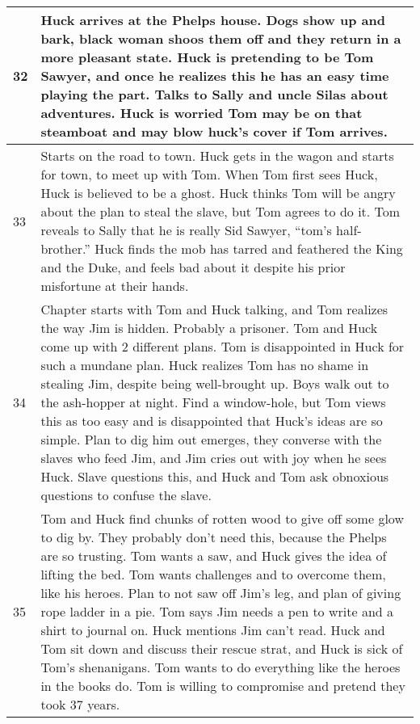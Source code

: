 \documentclass[10pt]{article}
\begin{document}
\section*{}
\begin{tabular}{|||l||p{15cm}|||}
\hline \hline
	32 & Huck arrives at the Phelps house.  Dogs show up and bark, black woman shoos them off and they return in a more pleasant state.  Huck is pretending to be Tom Sawyer, and once he realizes this he has an easy time playing the part.  Talks to Sally and uncle Silas about adventures.  Huck is worried Tom may be on that steamboat and may blow huck's cover if Tom arrives.\\ \hline \hline
	33 & Starts on the road to town.  Huck gets in the wagon and starts for town, to meet up with Tom.  When Tom first sees Huck, Huck is believed to be a ghost.  Huck thinks Tom will be angry about the plan to steal the slave, but Tom agrees to do it.  Tom reveals to Sally that he is really Sid Sawyer, ``tom's half-brother.''  Huck finds the mob has tarred and feathered the King and the Duke, and feels bad about it despite his prior misfortune at their hands.\\ \hline \hline
	34 & Chapter starts with Tom and Huck talking, and Tom realizes the way Jim is hidden.  Probably a prisoner.  Tom and Huck come up with 2 different plans.  Tom is disappointed in Huck for such a mundane plan.  Huck realizes Tom has no shame in stealing Jim, despite being well-brought up.  Boys walk out to the ash-hopper at night.  Find a window-hole, but Tom views this as too easy and is disappointed that Huck's ideas are so simple.  Plan to dig him out emerges, they converse with the slaves who feed Jim, and Jim cries out with joy when he sees Huck.  Slave questions this, and Huck and Tom ask obnoxious questions to confuse the slave.\\ \hline \hline
	35 & Tom and Huck find chunks of rotten wood to give off some glow to dig by.  They probably don't need this, because the Phelps are so trusting.  Tom wants a saw, and Huck gives the idea of lifting the bed.  Tom wants challenges and to overcome them, like his heroes.  Plan to not saw off Jim's leg, and plan of giving rope ladder in a pie.  Tom says Jim needs a pen to write and a shirt to journal on.  Huck mentions Jim can't read.  Huck and Tom sit down and discuss their rescue strat, and Huck is sick of Tom's shenanigans.  Tom wants to do everything like the heroes in the books do.  Tom is willing to compromise and pretend they took 37 years.\\
\hline \hline
\end{tabular}
\end{document}
